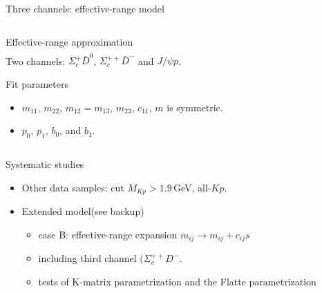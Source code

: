 \documentclass[aspectratio=169]{beamer}
\begin{document}
\begin{frame}[noframenumbering]{Three channels: effective-range model}
\begin{columns}
\begin{column}{0.57\textwidth}
\begin{block}{Effective-range approximation}
\begin{align*}
            \end{align*}
            Two channels: $\Sigma_c^+ \bar{D}^0$, $\Sigma_c^{++} \bar{D}^-$ and $J/\psi p$.
        \end{block}
        \begin{exampleblock}{Fit parameters}
            \begin{itemize}
                \item $m_{11}$, $m_{22}$, $m_{12}=m_{13}$, $m_{23}$, $c_{11}$, $m$ is symmetric.
                \item $p_0$, $p_1$, $b_0$, and $b_1$.
            \end{itemize}
        \end{exampleblock}
    \end{column}
\end{columns}
\end{frame}

\begin{frame}[noframenumbering]{Systematic studies}
\begin{itemize}
    \item Other data samples: cut $M_{Kp}>1.9\,$GeV, all-$Kp$.
    \item Extended model(see backup)
    \begin{itemize}
        \item case B: effective-range expansion $m_{ij} \to m_{ij}+c_{ij} s$
        \item including third channel $(\Sigma_c^{++} D^-$.
        \item tests of K-matrix parametrization and the Flatte parametrization
    \end{itemize}
\end{itemize}
\end{frame}
\end{document}

